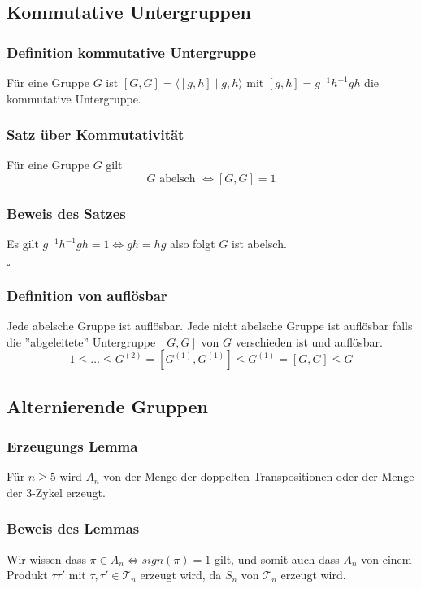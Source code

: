\documentclass[12pt, german]{article}
\newcommand{\bewiesen}{

\begin{flushright}
		$\square$  \\
\end{flushright}}
\begin{document}
\subsection{Kommutative Untergruppen}
\subsubsection{Definition kommutative Untergruppe}
	Für eine Gruppe $G$ ist $[G, G] = \langle [g, h] \mid g, h \rangle$ mit $[g, h] = g^{-1}h^{-1}gh$ die kommutative Untergruppe. 

\subsubsection{Satz über Kommutativität}
	Für eine Gruppe $G$ gilt $$ G \text{ abelsch } \iff [G, G] = 1$$

\subsubsection{Beweis des Satzes}
	Es gilt $g^{-1}h^{-1}gh = 1 \iff gh = hg$ also folgt $G$ ist abelsch. 
	\bewiesen

\subsubsection{Definition von auflösbar}
	Jede abelsche Gruppe ist auflösbar. Jede nicht abelsche Gruppe ist auflösbar falls die ''abgeleitete'' Untergruppe $[G, G]$ von $G$ verschieden ist und auflösbar. 
	\begin{equation*}
		1 \leq \ldots \leq G^{(2)} = [G^{(1)}, G^{(1)} ] \leq G^{(1)} = [G, G ] \leq G  
	\end{equation*}

\subsection{Alternierende Gruppen}
\subsubsection{Erzeugungs Lemma}
	Für $n \geq 5$ wird $A_n$ von der Menge der doppelten Transpositionen oder der Menge der $3$-Zykel erzeugt.

\subsubsection{Beweis des Lemmas}
	Wir wissen dass $\pi \in A_n \iff sign(\pi) = 1$ gilt, und somit auch dass $A_n$ von einem Produkt $\tau \tau'$ mit $\tau, \tau' \in \mathcal T_n$ erzeugt wird, 
	da $S_n$ von $\mathcal T_n$ erzeugt wird. 
	\newline 
	
\end{document}
